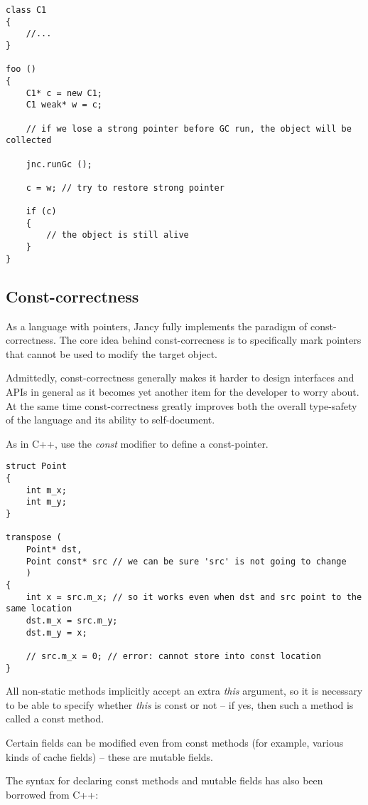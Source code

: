 \documentclass[oneside]{book}
\begin{document}
\begin{lstlisting}
class C1
{
    //...
}

foo ()
{
    C1* c = new C1;
    C1 weak* w = c;

    // if we lose a strong pointer before GC run, the object will be collected

    jnc.runGc ();

    c = w; // try to restore strong pointer

    if (c)
    {
        // the object is still alive
    }
}
\end{lstlisting}

\subsection{Const-correctness}

As a language with pointers, Jancy fully implements the paradigm of const-correctness. The core idea behind const-correcness is to specifically mark pointers that cannot be used to modify the target object.

Admittedly, const-correctness generally makes it harder to design interfaces and APIs in general as it becomes yet another item for the developer to worry about. At the same time const-correctness greatly improves both the overall type-safety of the language and its ability to self-document.

As in C++, use the \emph{const} modifier to define a const-pointer.

\begin{lstlisting}
struct Point
{
    int m_x;
    int m_y;
}

transpose (
    Point* dst,
    Point const* src // we can be sure 'src' is not going to change 
    )
{
    int x = src.m_x; // so it works even when dst and src point to the same location
    dst.m_x = src.m_y;
    dst.m_y = x;

    // src.m_x = 0; // error: cannot store into const location
}
\end{lstlisting}

All non-static methods implicitly accept an extra \emph{this} argument, so it is necessary to be able to specify whether \emph{this} is const or not -- if yes, then such a method is called a const method.

Certain fields can be modified even from const methods (for example, various kinds of cache fields) -- these are mutable fields.

The syntax for declaring const methods and mutable fields has also been borrowed from C++:
\end{document}
